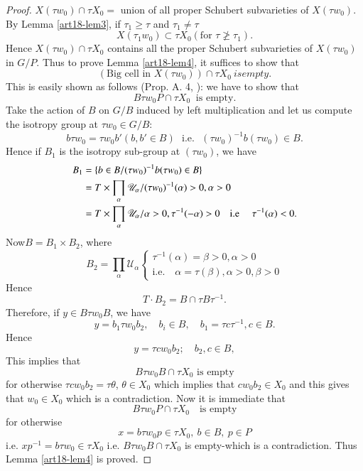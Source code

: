 \begin{proof}
$X (\tau w_0) \cap \tau X_0 = $ union of all proper Schubert subvarieties of $X(\tau w_0)$. By Lemma \ref{art18-lem3}, if $\tau_1 \geqslant \tau$ and $\tau_1 \neq \tau$
$$
X(\tau_1 w_0) \subset \tau X_0 (\text{for } \tau \not\geqslant \tau_1).
$$
Hence $X(\tau w_0) \cap \tau X_0$ contains all the proper Schubert subvarieties of $X(\tau w_0)$ in $G/P$. Thus to prove Lemma \ref{art18-lem4}, it suffices to show that 
$$
(\text{Big cell in } X (\tau w_0)) \cap \tau X_0 ~ is empty.
$$
This is easily shown as follows (\cf Prop. A. 4, \cite{art18-key12}): we have to show that 
$$
B \tau w_0 P \cap \tau X_0 ~ \text{ is empty}.
$$
Take the action of $B$ on $G/B$ induced by left multiplication and let us compute the isotropy group at $\tau w_0 \in G / B$: 
$$
b \tau w_0 = \tau w_0 b' (b, b' \in B) \text{~ i.e. ~} (\tau w_0)^{-1} b (\tau w_0) \in B.
$$
Hence if $B_1$ is the isotropy sub-group at $(\tau w_0)$, we have 
\begin{align*}
B_1 &  = \{b \in B/ (\tau w_0)^{-1} b (\tau w_0) \in B\}\\
& = T \times \prod\limits_\alpha \mathscr{U}_\alpha / (\tau w_0)^{-1} (\alpha) > 0, \alpha > 0\\
& = T \times \prod\limits_{\alpha} \mathscr{U}_\alpha/ \alpha  >0, \tau^{-1} (-\alpha) > 0 \text{\quad i.e \quad} \tau^{-1} (\alpha) < 0.
\end{align*}
Now\pageoriginale $B = B_1 \times B_2$, where
$$
B_2 = \prod\limits_\alpha \mathscr{U}_\alpha
\begin{cases}
\tau^{-1} (\alpha) = \beta > 0, \alpha > 0\\
\text{i.e. ~ } \alpha  =\tau (\beta), \alpha > 0, \beta > 0
\end{cases}
$$
Hence
$$
T \cdot B_2 = B \cap \tau B \tau^{-1}.
$$
Therefore, if $y \in B \tau w_0 B$, we have 
$$
y = b_1 \tau w_0 b_2 , \quad b_i \in B, \quad b_1 = \tau c \tau^{-1}, c \in B.
$$ 
Hence
$$
y = \tau c w_0 b_2 ; \quad b_2, c \in B,
$$
This implies that 
$$
B \tau w_0 B \cap \tau X_0 \text{ is empty}
$$
for otherwise $\tau c w_0 b_2 = \tau \theta$, $\theta \in X_0$ which implies that $c w_0 b_2 \in X_0$ and this gives that $w_0 \in X_0$ which is a contradiction. Now it is immediate that 
$$
B \tau w_0 P \cap \tau X_0 \text{ ~ is empty}
$$
for otherwise
$$
x = b \tau w_0 p \in \tau X_0, ~ b \in B , ~ p \in P
$$
i.e. $x p^{-1} = b \tau w_0 \in \tau X_0$ i.e. $B \tau w_0 B \cap \tau X_0$ is empty-which is a contradiction. Thus Lemma \ref{art18-lem4} is proved. 
\end{proof}

